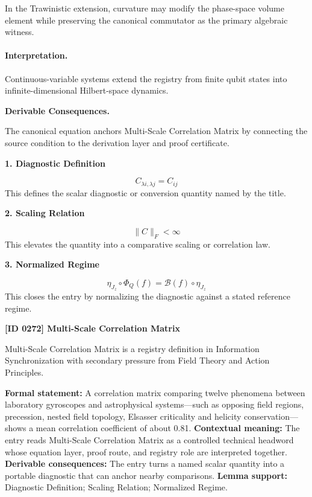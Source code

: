 In the Trawinistic extension, curvature may modify the phase-space volume element while preserving the canonical commutator as the primary algebraic witness.

\paragraph{Interpretation.}
Continuous-variable systems extend the registry from finite qubit states into infinite-dimensional Hilbert-space dynamics.

\par\vspace{0.35em}
\noindent\textbf{Derivable Consequences.}\quad
\begingroup
\footnotesize
\raggedright
The canonical equation anchors Multi-Scale Correlation Matrix by connecting the source condition to the derivation layer and proof certificate.
\par\endgroup

\noindent\textbf{1. Diagnostic Definition}\par
\[
C_{\lambda i,\lambda j}=C_{ij}
\]
\noindent This defines the scalar diagnostic or conversion quantity named by the title.\par
\noindent\textbf{2. Scaling Relation}\par
\[
\|C\|_{F}<\infty
\]
\noindent This elevates the quantity into a comparative scaling or correlation law.\par
\noindent\textbf{3. Normalized Regime}\par
\[
\eta_{J_z}\circ\Phi_Q(f)=\mathcal{B}(f)\circ\eta_{J_z}
\]
\noindent This closes the entry by normalizing the diagnostic against a stated reference regime.\par

\clearpage
\noindent\textbf{[ID 0272] Multi-Scale Correlation Matrix}\par
\vspace{0.35em}
\begingroup\small
{}
Multi-Scale Correlation Matrix is a registry definition in Information Synchronization with secondary pressure from Field Theory and Action Principles.

\begingroup\footnotesize\setlength{\emergencystretch}{3em}\sloppy
\textbf{Formal statement:} A correlation matrix comparing twelve phenomena between laboratory gyroscopes and astrophysical systems---such as opposing field regions, precession, nested field topology, Elsasser criticality and helicity conservation---shows a mean correlation coefficient of about 0.81. \textbf{Contextual meaning:} The entry reads Multi-Scale Correlation Matrix as a controlled technical headword whose equation layer, proof route, and registry role are interpreted together. \textbf{Derivable consequences:} The entry turns a named scalar quantity into a portable diagnostic that can anchor nearby comparisons. \textbf{Lemma support:} Diagnostic Definition; Scaling Relation; Normalized Regime.\par
\endgroup


